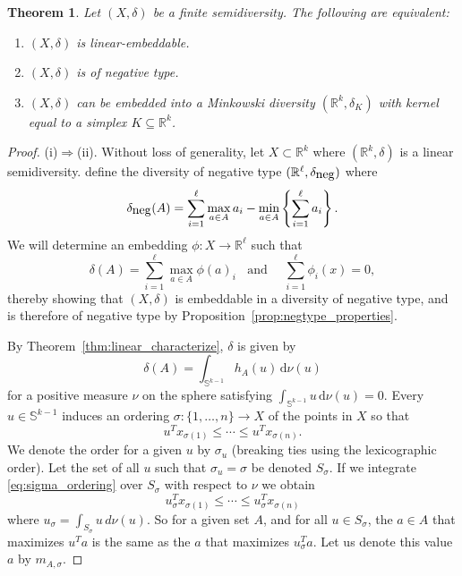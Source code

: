 \documentclass[11pt]{article}
\newtheorem{theorem}{Theorem}
\renewcommand{\Re}{\mathbb{R}}
\newcommand{\deltaneg}{\delta_{\mbox{\footnotesize{neg}}}}
\begin{document}
\begin{theorem} \label{thm:linearEmbed}
Let $(X,\delta)$ be a finite semidiversity. The following are equivalent:
\begin{enumerate}
\item[(i)]$(X,\delta)$  is linear-embeddable.
\item[(ii)] $(X,\delta)$ is of negative type.
\item[(iii)] $(X,\delta)$ can be embedded into a Minkowski diversity $(\Re^k,\delta_K)$ with kernel equal to a  simplex $K \subseteq \Re^k$.
\end{enumerate}
\end{theorem}

\begin{proof}
(i)$\Rightarrow$(ii). Without loss of generality, let $X \subset \Re^k$ where $(\Re^k,\delta)$ is a linear semidiversity. \cite[Sec. 3]{WuBryantEtal19} define the diversity of negative type $(\Re^\ell,\deltaneg)$ where 
\[
\deltaneg (A) = \sum_{i=1}^\ell \max_{a \in A} a_i - \min_{a \in A} \left\{ \sum_{i=1}^\ell a_i \right\}.
\]
We will determine an embedding $\phi \colon X \rightarrow \Re^\ell$ such that
\[
\delta(A) =  \sum_{i=1}^\ell \max_{a \in A} \phi(a)_i \ \ \ \  \text{and} \ \ \ \  \ \  \sum_{i=1}^\ell \phi_i(x)=0,
\]
thereby showing that $(X,\delta)$ is embeddable in a diversity of negative type, and is therefore of negative type by Proposition~\ref{prop:negtype_properties}.

By Theorem~\ref{thm:linear_characterize}, $\delta$ is given by
    \[
    \delta(A) = \int_{\mathbb{S}^{k-1}} h_A(u) \, \mathrm{d}\nu(u)
    \]
    for a positive measure $\nu$ on the sphere satisfying $\int_{\mathbb{S}^{k-1}} u \, \mathrm{d} \nu(u) = 0$. 
    Every $u \in \mathbb{S}^{k-1}$ induces an ordering $\sigma \colon  \{1,\ldots,n\} \rightarrow X$ of the points in $X$ so that
    \begin{equation} \label{eq:sigma_ordering}
    u^T x_{\sigma(1)} \leq \cdots \leq u^T x_{\sigma(n)}.
    \end{equation}
    We denote the order for a given $u$ by $\sigma_u$ (breaking ties using the lexicographic order). Let the set of all $u$ such that $\sigma_u =\sigma$ be denoted $S_\sigma$.
If we integrate \eqref{eq:sigma_ordering} over $S_\sigma$ with respect to $\nu$ we obtain
  \begin{equation} \label{eq:sigma_ordering_integrated}
    u_\sigma^T x_{\sigma(1)} \leq \cdots \leq u_\sigma^T x_{\sigma(n)}
    \end{equation}
where $u_\sigma= \int_{S_\sigma} u \, d\nu(u)$. So for a given set $A$, and for all $u \in S_\sigma$, the $a \in A$ that maximizes $u^T a$ is the same as the $a$ that maximizes $u_\sigma^T a$. Let us denote this value $a$ by $m_{A,\sigma}$.
    

\end{proof}
\end{document}
